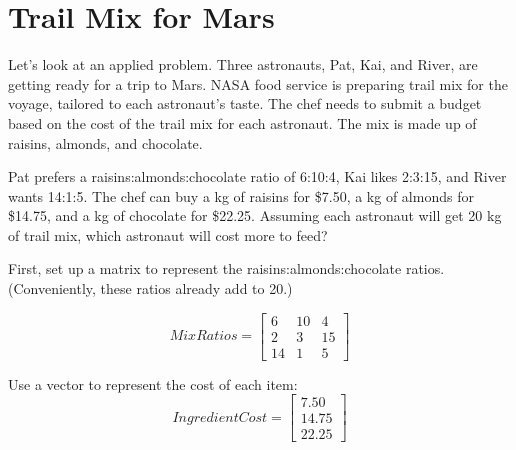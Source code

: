 	



\section{Trail Mix for Mars}
Let's look at an applied problem. Three astronauts, Pat, Kai, and River, are getting ready for a trip to Mars. NASA food service is preparing trail mix for the voyage, tailored to each astronaut's taste. The chef needs to submit a budget based on the cost of the trail mix for each astronaut. The mix is made up of raisins, almonds, and chocolate.

Pat prefers a raisins:almonds:chocolate ratio of 6:10:4, Kai likes 2:3:15, and River wants 14:1:5. The chef can buy a kg of raisins for \$7.50, a kg of almonds for \$14.75, and a kg of chocolate for \$22.25. Assuming each astronaut will get 20 kg of trail mix, which astronaut will cost more to feed?

First, set up a matrix to represent the raisins:almonds:chocolate ratios. (Conveniently, these ratios already add to 20.)

$$MixRatios = \begin{bmatrix}
6 & 10 & 4  \\
2 & 3 & 15 \\
14 & 1 & 5
\end{bmatrix}$$

Use a vector to represent the cost of each item:
$$IngredientCost = 
\begin{bmatrix}
7.50 \\
14.75 \\
22.25
\end{bmatrix}$$

